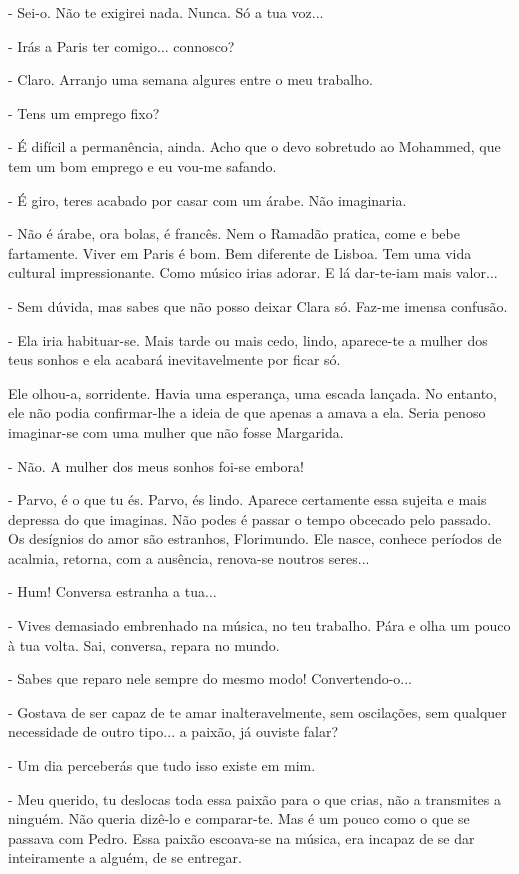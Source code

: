 - Sei-o. Não te exigirei nada. Nunca. Só a tua voz...

- Irás a Paris ter comigo... connosco?

- Claro. Arranjo uma semana algures entre o meu trabalho.

- Tens um emprego fixo?

- É difícil a permanência, ainda. Acho que o devo sobretudo ao Mohammed,
que tem um bom emprego e eu vou-me safando.

- É giro, teres acabado por casar com um árabe. Não imaginaria.

- Não é árabe, ora bolas, é francês. Nem o Ramadão pratica, come e bebe
fartamente. Viver em Paris é bom. Bem diferente de Lisboa. Tem uma vida
cultural impressionante. Como músico irias adorar. E lá dar-te-iam mais
valor...

- Sem dúvida, mas sabes que não posso deixar Clara só. Faz-me imensa
confusão.

- Ela iria habituar-se. Mais tarde ou mais cedo, lindo, aparece-te a
mulher dos teus sonhos e ela acabará inevitavelmente por ficar só.

Ele olhou-a, sorridente. Havia uma esperança, uma escada lançada. No
entanto, ele não podia confirmar-lhe a ideia de que apenas a amava a
ela. Seria penoso imaginar-se com uma mulher que não fosse Margarida.

- Não. A mulher dos meus sonhos foi-se embora!

- Parvo, é o que tu és. Parvo, és lindo. Aparece certamente essa sujeita
e mais depressa do que imaginas. Não podes é passar o tempo obcecado
pelo passado. Os desígnios do amor são estranhos, Florimundo. Ele nasce,
conhece períodos de acalmia, retorna, com a ausência, renova-se noutros
seres...

- Hum! Conversa estranha a tua...

- Vives demasiado embrenhado na música, no teu trabalho. Pára e olha um
pouco à tua volta. Sai, conversa, repara no mundo.

- Sabes que reparo nele sempre do mesmo modo! Convertendo-o...

- Gostava de ser capaz de te amar inalteravelmente, sem oscilações, sem
qualquer necessidade de outro tipo... a paixão, já ouviste falar?

- Um dia perceberás que tudo isso existe em mim.

- Meu querido, tu deslocas toda essa paixão para o que crias, não a
transmites a ninguém. Não queria dizê-lo e comparar-te. Mas é um pouco
como o que se passava com Pedro. Essa paixão escoava-se na música, era
incapaz de se dar inteiramente a alguém, de se entregar.

